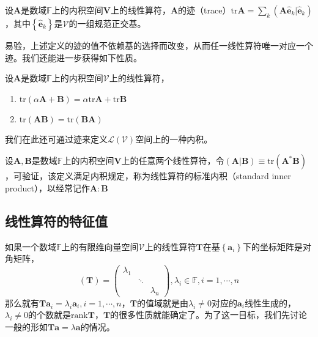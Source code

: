 \documentclass[main.tex]{subfiles}
\begin{document}
\begin{definition}[线性算符的迹]
设$\mathbf{A}$是数域$\mathbb{F}$上的内积空间$\mathbf{V}$上的线性算符，$\mathbf{A}$的迹（trace）$\mathrm{tr}\mathbf{A}=\sum_k\left(\mathbf{A}\mathbf{\hat{e}}_k|\mathbf{\hat{e}}_k\right)$，其中$\left\{\mathbf{\hat{e}}_k\right\}$是$\mathcal{V}$的一组规范正交基。
\end{definition}

易验，上述定义的迹的值不依赖基的选择而改变，从而任一线性算符唯一对应一个迹。我们还能进一步获得如下性质。

\begin{theorem}
设$\mathbf{A}$是数域$\mathbb{F}$上的内积空间$\mathcal{V}$上的线性算符，
\begin{enumerate}
    \item $\mathrm{tr}\left(\alpha\mathbf{A}+\mathbf{B}\right)=\alpha\mathrm{tr}\mathbf{A}+\mathrm{tr}\mathbf{B}$
    \item $\mathrm{tr}\left(\mathbf{AB}\right)=\mathrm{tr}\left(\mathbf{BA}\right)$
\end{enumerate}
\end{theorem}

我们在此还可通过迹来定义$\mathcal{L}\left(\mathcal{V}\right)$空间上的一种内积。

\begin{definition}[线性算符的标准内积]
设$\mathbf{A},\mathbf{B}$是数域$\mathbb{F}$上的内积空间$\mathbf{V}$上的任意两个线性算符，令$\left(\mathbf{A}|\mathbf{B}\right)\equiv\mathrm{tr}\left(\mathbf{A}^*\mathbf{B}\right)$，可验证，该定义满足内积规定，称为线性算符的标准内积（standard inner product），以经常记作$\mathbf{A}:\mathbf{B}$
\end{definition}

\subsection{线性算符的特征值}
如果一个数域$\mathbb{F}$上的有限维向量空间$\mathcal{V}$上的线性算符$\mathbf{T}$在基$\left\{\mathbf{a}_i\right\}$下的坐标矩阵是对角矩阵，
\[\left(\mathbf{T}\right)=\left(\begin{array}{ccc}\lambda_1&&\\&\ddots&\\&&\lambda_n\end{array}\right),\lambda_i\in\mathbb{F},i=1,\cdots,n\]
那么就有$\mathbf{Ta}_i=\lambda_i \mathbf{a}_i,i=1,\cdots,n$，$\mathbf{T}$的值域就是由$\lambda_i\neq 0$对应的$\mathbf{a}_i$线性生成的，$\lambda_i\neq 0$的个数就是$\mathrm{rank}\mathbf{T}$，$\mathbf{T}$的很多性质就能确定了。为了这一目标，我们先讨论一般的形如$\mathbf{Ta}=\lambda\mathbf{a}$的情况。
\end{document}
